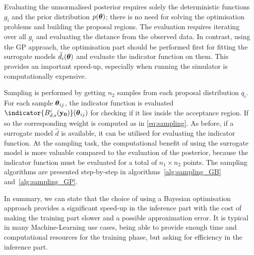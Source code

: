 \noindent
Evaluating the unnormalised posterior requires solely the
deterministic functions $g_i$ and the prior distribution $p(\boldsymbol{\theta})$;
there is no need for solving the optimisation problems and building
the proposal regions. The evaluation requires iterating over all $g_i$
and evaluating the distance from the observed data. In contrast, using
the GP approach, the optimisation part should be performed first for
fitting the surrogate models $\hat{d}_i(\boldsymbol{\theta})$ and evaluate the
indicator function on them. This provides an important speed-up,
especially when running the simulator is computationally
expensive. %

\noindent
Sampling is performed by getting $n_2$ samples from each proposal
distribution $q_i$. For each sample $\boldsymbol{\theta}_{ij}$, the indicator
function is evaluated $\indicator{\regioni(\data)}(\thetab_{ij})$ for
checking if it lies inside the acceptance region. If so the
corresponding weight is computed as in \eqref{eq:sampling}. As before,
if a surrogate model $\hat{d}$ is available, it can be utilised for
evaluating the indicator function. At the sampling task, the
computational benefit of using the surrogate model is more valuable
compared to the evaluation of the posterior, because the indicator
function must be evaluated for a total of $n_1 \times n_2$ points. The
sampling algorithms are presented step-by-step in
algorithms~\ref{alg:sampling_GB} and~\ref{alg:sampling_GP}.

\noindent
In summary, we can state that the choice of using a Bayesian
optimisation approach provides a significant speed-up in the inference
part with the cost of making the training part slower and a possible
approximation error. It is typical in many Machine-Learning use cases,
being able to provide enough time and computational resources for the
training phase, but asking for efficiency in the inference
part.

